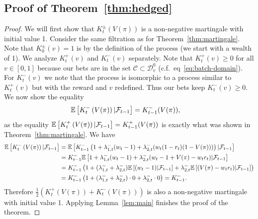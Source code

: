 \subsection{Proof of Theorem~\ref{thm:hedged}}
\begin{proof}
We will first show that $K_t^{\pm}(V(\pi))$ is a non-negative martingale with initial
value 1.
Consider the same filtration as for Theorem~\ref{thm:martingale}.
Note that $K_0^{\pm}(v)=1$ is by 
the definition of the process (we start with a wealth of 1).
We analyze $K_t^{+}(v)$ and $K_t^{-}(v)$ separately. 
Note that $K_t^{+}(v)\geq 0$ for all $v \in [0,1]$ because our bets 
are in the set $\mathcal{C} \subset \mathcal{D}_v^0$ (c.f.\ eq~\eqref{eq:batch-domain}).
For $K_t^{-}(v)$ we note that the process is isomorphic to a process
similar to $K_t^{+}(v)$ but with the reward and $v$ redefined. Thus
our bets keep $K_t^{-}(v)\geq 0$. 
We now show the equality
\begin{align*}
 \mathbb{E}\left[K_t^{-}\left(V(\pi)\right)|\mathcal{F}_{t-1}\right]&=K_{t-1}^{-}(V(\pi)),
\end{align*}
as the equality $\mathbb{E}\left[K_t^{+}\left(V(\pi)\right)|\mathcal{F}_{t-1}\right]=K_{t-1}^{+}(V(\pi))$ is exactly what was shown in Theorem~\ref{thm:martingale}.  
We have
\begin{align*}
    \mathbb{E}\left[K_t^{-}\left(V(\pi)\right)|\mathcal{F}_{t-1}\right]&=
    \mathbb{E}\left[K_{t-1}^{-}\left(1+\lambda_{1,t}^{-}(w_t-1)+\lambda_{2,t}^{-}(w_t (1-r_t) (1-V(\pi)))\right)|\mathcal{F}_{t-1}\right]\\
    &=K_{t-1}^{-} \mathbb{E}\left[1+\lambda_{1,t}^{-}(w_t-1)+\lambda_{2,t}^{-}(w_t - 1 + V(\pi) - w_t r_t)|\mathcal{F}_{t-1}\right]\\
    &=K_{t-1}^{-} \left(1+(\lambda_{1,t}^{-}+\lambda_{2,t}^{-})\mathbb{E}\left[(w_t-1)|\mathcal{F}_{t-1}\right]+
    \lambda_{2,t}^{-}\mathbb{E}\left[(V(\pi)-w_t r_t)|\mathcal{F}_{t-1}\right]\right)\\
    &=K_{t-1}^{-} \left(1+(\lambda_{1,t}^{-}+\lambda_{2,t}^{-})\cdot 0 + \lambda_{2,t}^{-} \cdot 0\right) = K_{t-1}^{-}.
\end{align*}
Therefore $\frac{1}{2}\left(K_t^{+}\left(V(\pi)\right)+K_t^{-}\left(V(\pi)\right)\right)$ is also a non-negative martingale with initial value 1. Applying 
Lemma~\ref{lem:main} finishes the proof of the theorem.
\end{proof}

